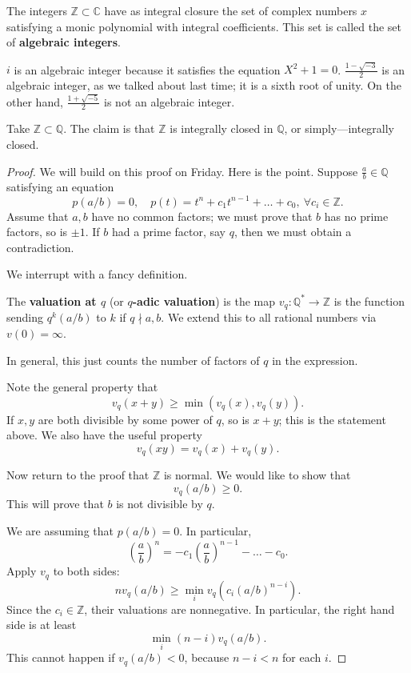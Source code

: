 \begin{example} 
The integers $\mathbb{Z} \subset \mathbb{C}$ have as integral closure the set
of complex numbers $x$ satisfying a monic polynomial with integral
coefficients.  This set is called the set of \textbf{algebraic integers}.
\end{example} 

\begin{example} 
$i$ is an algebraic integer because it satisfies the equation $X^2 +1 = 0$.
$\frac{1 - \sqrt{-3}}{2}$ is an algebraic integer, as we talked about last
time; it is a sixth root of unity.  On the other hand, $\frac{1+\sqrt{-5}}{2}$
is not an algebraic integer. 
\end{example} 

\begin{example} 
Take $\mathbb{Z} \subset \mathbb{Q}$. The claim is that $\mathbb{Z}$ is
integrally closed in $\mathbb{Q}$, or simply---integrally closed. 
\end{example} 
\begin{proof} 
We will build on this proof on Friday. Here is the point. Suppose $\frac{a}{b}
\in \mathbb{Q}$ satisfying an equation
\[ p(a/b) = 0, \quad p(t) = t^n + c_1 t^{n-1} + \dots + c_0 , \ \forall c_i \in
\mathbb{Z}.\]
Assume that $a,b$ have no common factors; we must prove that $b$ has no prime
factors, so is $\pm 1$. 
If $b$ had a prime factor, say $q$, then we must obtain a contradiction.

We interrupt with a fancy definition.
\begin{definition} 
The \textbf{valuation at $q$} (or \textbf{$q$-adic valuation}) is the map
$v_q: \mathbb{Q}^* \to \mathbb{Z}$ is the
function sending $q^k (a/b)$ to $k$ if $q \nmid a,b$. We extend this to all
rational numbers via $v(0) = \infty$. 
\end{definition} 
In general, this just counts the number of factors of $q$ in the expression.


Note the general property that
\[ v_q(x+y) \geq \min( v_q(x), v_q(y)) . \]
If $x,y$ are both divisible by some power of $q$, so is $x+y$; this is the
statement above. We also have the useful property
\[ v_q(xy) = v_q(x) + v_q(y).  \]




Now return to the proof that $\mathbb{Z}$ is normal. We would like to show that
\[ v_q(a/b) \geq 0.  \]
This will prove that $b$ is not divisible by $q$.

We are assuming that $p(a/b) = 0$. In particular,
\[ \left( \frac{a}{b}  \right)^n = -c_1 \left( \frac{a}{b}  \right)^{n-1} -
\dots - c_0.  \]
Apply $v_q$ to both sides:
\[ n v_q ( a/b) \geq \min_i v_q( c_i (a/b)^{n-i}).  \]
Since the $c_i \in \mathbb{Z}$, their valuations are nonnegative. In
particular, the right hand side is at least
\[ \min_i  (n-i) v_q(a/b). \]
This cannot happen if $v_q(a/b)<0$, because $n-i < n$ for each $i$. 
\end{proof} 

